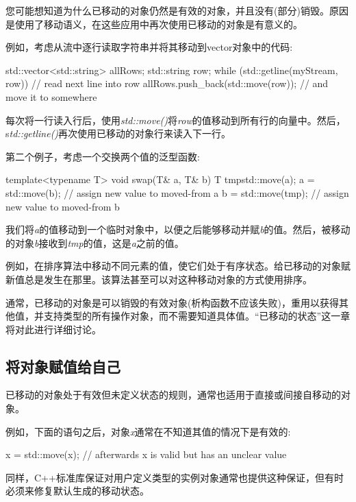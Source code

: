 您可能想知道为什么已移动的对象仍然是有效的对象，并且没有(部分)销毁。原因是使用了移动语义，在这些应用中再次使用已移动的对象是有意义的。

例如，考虑从流中逐行读取字符串并将其移动到vector对象中的代码:

\begin{cppcode}
std::vector<std::string> allRows;
std::string row;
while (std::getline(myStream, row)) { // read next line into row
	allRows.push_back(std::move(row)); // and move it to somewhere
}
\end{cppcode}

每次将一行读入行后，使用\textit{std::move()}将\textit{row}的值移动到所有行的向量中。然后，s\textit{td::getline()}再次使用已移动的对象行来读入下一行。

第二个例子，考虑一个交换两个值的泛型函数:

\begin{cppcode}
template<typename T>
void swap(T& a, T& b)
{
	T tmp{std::move(a)};
	a = std::move(b); // assign new value to moved-from a
	b = std::move(tmp); // assign new value to moved-from b
}
\end{cppcode}

我们将\textit{a}的值移动到一个临时对象中，以便之后能够移动并赋\textit{b}的值。然后，被移动的对象\textit{b}接收到\textit{tmp}的值，这是\textit{a}之前的值。

例如，在排序算法中移动不同元素的值，使它们处于有序状态。给已移动的对象赋新值总是发生在那里。该算法甚至可以对这种移动对象的方式使用排序。

通常，已移动的对象是可以销毁的有效对象(析构函数不应该失败)，重用以获得其他值，并支持类型的所有操作对象，而不需要知道具体值。“已移动的状态”这一章将对此进行详细讨论。

\subsection{将对象赋值给自己}

已移动的对象处于有效但未定义状态的规则，通常也适用于直接或间接自移动的对象。

例如，下面的语句之后，对象\textit{x}通常在不知道其值的情况下是有效的:

\begin{cppcode}
x = std::move(x); // afterwards x is valid but has an unclear value
\end{cppcode}

同样，C++标准库保证对用户定义类型的实例对象通常也提供这种保证，但有时必须来修复默认生成的移动状态。



